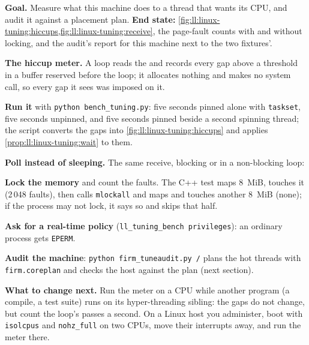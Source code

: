 \begin{tutorial}
\textbf{Goal.} Measure what this machine does to a thread that wants its CPU, and audit it against a placement plan.
\textbf{End state:} \cref{fig:ll:linux-tuning:hiccups,fig:ll:linux-tuning:receive}, the page-fault counts with and without
locking, and the audit's report for this machine next to the two fixtures'.
\begin{tutsteps}
\item \textbf{The hiccup meter.} A loop reads the  and records every gap above a threshold in a buffer
reserved before the loop; it allocates nothing and makes no system call, so every gap it sees was imposed on it.
\label{lst:ll:linux-tuning:meter}
\item \textbf{Run it} with \texttt{python bench\_tuning.py}: five seconds pinned alone with \texttt{taskset}, five seconds
unpinned, and five seconds pinned beside a second spinning thread; the script converts the gaps into
\cref{fig:ll:linux-tuning:hiccups} and applies \cref{prop:ll:linux-tuning:wait} to them.
\item \textbf{Poll instead of sleeping.} The same receive, blocking or in a non-blocking loop:
\label{lst:ll:linux-tuning:receive}
\item \textbf{Lock the memory} and count the faults. The C++ test maps 8~MiB, touches it (2\,048 faults), then calls
\texttt{mlockall} and maps and touches another 8~MiB (none); if the process may not lock, it says so and skips that half.
\label{lst:ll:linux-tuning:lock}
\item \textbf{Ask for a real-time policy} (\texttt{ll\_tuning\_bench privileges}): an ordinary process gets \texttt{EPERM}.
\item \textbf{Audit the machine}: \texttt{python firm\_tuneaudit.py /} plans the hot threads with \texttt{firm.coreplan} and
checks the host against the plan (next section).
\end{tutsteps}
\textbf{What to change next.} Run the meter on a CPU while another program (a compile, a test suite) runs on its hyper-threading
sibling: the gaps do not change, but count the loop's passes a second. On a Linux host you administer, boot with
\texttt{isolcpus} and \texttt{nohz\_full} on two CPUs, move their interrupts away, and run the meter there.
\end{tutorial}


